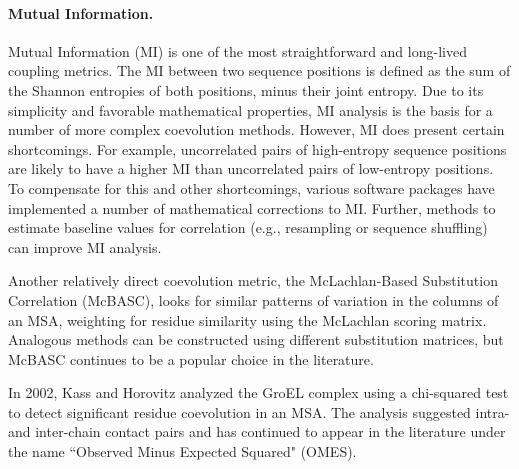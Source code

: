 \paragraph{Mutual Information.} Mutual Information (MI) is one of the most straightforward and long-lived coupling metrics. The MI between two sequence positions is defined as the sum of the Shannon entropies of both positions, minus their joint entropy. Due to its simplicity and favorable mathematical properties, MI analysis is the basis for a number of more complex coevolution methods. However, MI does present certain shortcomings. For example, uncorrelated pairs of high-entropy sequence positions are likely to have a higher MI than uncorrelated pairs of low-entropy positions.\cite{Simonetti2013a,Horner2007} To compensate for this and other shortcomings, various software packages have implemented a number of mathematical corrections to MI.\cite{Gao2011,Dunn2008,Wollenberg2000,Buslje2009a,Clark2014} Further, methods to estimate baseline values for correlation (e.g., resampling or sequence shuffling) can improve MI analysis.\cite{Martin2005,Crooks2004,Horner2007}
\par Another relatively direct coevolution metric, the McLachlan-Based Substitution Correlation (McBASC),\cite{Olmea1997} looks for similar patterns of variation in the columns of an MSA, weighting for residue similarity using the McLachlan scoring matrix.\cite{McLachlan1971} Analogous methods can be constructed using different substitution matrices, but McBASC continues to be a popular choice in the literature.\cite{Horner2007,Fodor2004a,Halperin2006}
\par In 2002, Kass and Horovitz\cite{Kass2002} analyzed the GroEL complex using a chi-squared test to detect significant residue coevolution in an MSA. The analysis suggested intra- and inter-chain contact pairs and has continued to appear in the literature under the name ``Observed Minus Expected Squared" (OMES).\cite{Horner2007,Ackerman2012,Pele2014a,Brown2010a,Fodor2004a}
